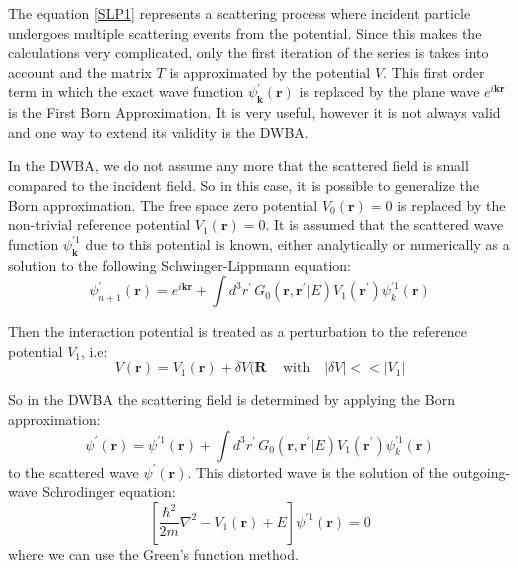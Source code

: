 The equation \eqref{SLP1} represents a scattering process where incident particle undergoes multiple scattering events from the potential. Since this makes the calculations very complicated, only the first iteration of the series is takes into account and the matrix $ T $ is approximated by the potential $ V $. This first order term in which the exact wave function $ \psi^{'}_{\mathbf{k}}(\mathbf{r}) $ is replaced by the plane wave $ e^{i\mathbf{k}\mathbf{r}} $ is the First Born Approximation. It is very useful, however it is not always valid and one way to extend its validity is the DWBA. 

In the DWBA, we do not assume any more that the scattered field is small compared to the incident field. So in this case, it is possible to generalize the Born approximation. The free space zero potential $ V_0(\mathbf{r}) = 0 $ is replaced by the non-trivial reference potential $ V_1(\mathbf{r}) = 0 $. It is assumed that the scattered wave function $ \psi_{\mathbf{k}}^{'1} $ due to this potential is known, either analytically or numerically as a solution to the following Schwinger-Lippmann equation:
\begin{equation}
\psi^{'}_{n+1}(\mathbf{r}) = e^{i\mathbf{k}\mathbf{r}} + \int{d^3r^{'}\,G_0(\mathbf{r}, \mathbf{r}^{'} | E)V_1(\mathbf{r}^{'})\psi^{'1}_k(\mathbf{r}) }
\end{equation}

Then the interaction potential is treated as a perturbation to the reference potential $ V_1 $, i.e:
\begin{equation}
V(\mathbf{r}) = V_1(\mathbf{r}) + \delta V(\mathbf{R} \,\,\,\,\,\text{ with }\,\,\,\,\left|\delta V\right| << \left|V_1\right|
\end{equation}

So in the DWBA the scattering field is determined by applying the Born approximation:
\begin{equation}
\psi^{'}(\mathbf{r}) = \psi^{'1}(\mathbf{r}) + \int{d^3r^{'}\,G_0(\mathbf{r}, \mathbf{r}^{'}| E)V_1(\mathbf{r}^{'})\psi^{'1}_k(\mathbf{r}) }
\end{equation}
to the scattered wave $ \psi^{'}(\mathbf{r}) $. This distorted wave is the solution of the outgoing-wave Schrodinger equation:
\begin{equation}
\left[\frac{\hbar^2}{2m}\nabla^2 - V_1(\mathbf{r}) + E \right]\psi^{'1}(\mathbf{r}) = 0
\end{equation}
where we can use the Green's function method.

